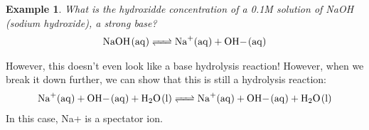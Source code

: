\documentclass{article}  %
\newtheorem{exmp}{Example}
\begin{document}
\begin{exmp}
    What is the hydroxidde concentration of a 0.1M solution of NaOH (sodium hydroxide), a strong base?
    \begin{equation*}
        \begin{aligned}
            \ce{NaOH_(aq) <=> Na+_(aq) + OH-_(aq)}
        \end{aligned}
    \end{equation*}    
\end{exmp}
However, this doesn't even look like a base hydrolysis reaction! However, when we break it down further, we can show that this is still a hydrolysis reaction:
\begin{equation*}
    \begin{aligned}
        \ce{Na+_(aq) + OH-_(aq) + H2O_(l) <=> Na+_(aq) + OH-_(aq) + H2O_(l)}
    \end{aligned}
\end{equation*}
In this case, Na+ is a spectator ion.
\end{document}
